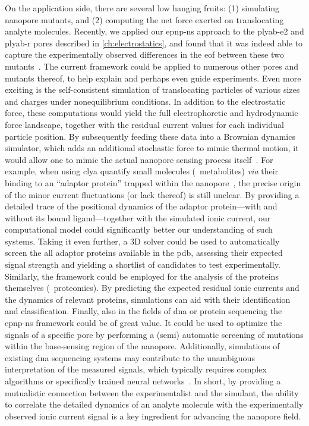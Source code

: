 On the application side, there are several low hanging fruits: (1) simulating nanopore mutants, and (2)
computing the net force exerted on translocating analyte molecules. Recently, we applied our \gls{epnp-ns}
approach to the \gls{plyab-e2} and \gls{plyab-r} pores described in \cref{ch:electrostatics}, and found that
it was indeed able to capture the experimentally observed differences in the \gls{eof} between these two
mutants~\cite{Huang-2020}. The current framework could be applied to numerous other pores and mutants thereof,
to help explain and perhaps even guide experiments. Even more exciting is the self-consistent simulation of
translocating particles of various sizes and charges under nonequilibrium conditions. In addition to the
electrostatic force, these computations would yield the full electrophoretic and hydrodynamic force landscape,
together with the residual current values for each individual particle position. By subsequently feeding these
data into a Brownian dynamics simulator, which adds an additional stochastic force to mimic thermal motion, it
would allow one to mimic the actual nanopore sensing process itself~\cite{Pederson-2015,Hulings-2018}. For
example, when using \gls{clya} quantify small molecules (\eg~metabolites) \textit{via} their binding to an
``adaptor protein'' trapped within the nanopore~\cite{Zernia-2020}, the precise origin of the minor current
fluctuations (or lack thereof) is still unclear. By providing a detailed trace of the positional dynamics of
the adaptor protein---with and without its bound ligand---together with the simulated ionic current, our
computational model could significantly better our understanding of such systems. Taking it even further, a 3D
solver could be used to automatically screen the all adaptor proteins available in the \gls{pdb}, assessing
their expected signal strength and yielding a shortlist of candidates to test experimentally. Similarly, the
framework could be employed for the analysis of the proteins themselves (\ie~proteomics). By predicting the
expected residual ionic currents and the dynamics of relevant proteins, simulations can aid with their
identification and classification. Finally, also in the fields of \gls{dna} or protein sequencing the
\gls{epnp-ns} framework could be of great value. It could be used to optimize the signals of a specific pore
by performing a (semi) automatic screening of mutations within the base-sensing region of the nanopore.
Additionally, simulations of existing \gls{dna} sequencing systems may contribute to the unambiguous
interpretation of the measured signals, which typically requires complex algorithms or specifically trained
neural networks~\cite{Wick-2019}. In short, by providing a mutualistic connection between the experimentalist
and the simulant, the ability to correlate the detailed dynamics of an analyte molecule with the
experimentally observed ionic current signal is a key ingredient for advancing the nanopore field.



\cleardoublepage

